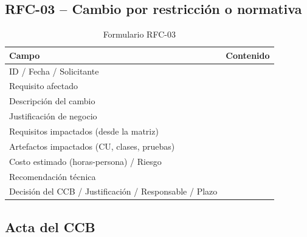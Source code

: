 \documentclass[journal,onecolumn]{IEEEtran}
\newcommand{\guia}[2]{%
	\begin{mdframed}[style=guia]
		\sloppy
		\noindent\textbf{Responsable: #1}\\[2pt]
		#2
	\end{mdframed}
}
\newif\ifguias
\let\guiaoriginal\guia
\renewcommand{\guia}[2]{\ifguias\guiaoriginal{#1}{#2}\fi}
\begin{document}
	\subsection{RFC-03 -- Cambio por restricción o normativa}
	
	\begin{table}[H]
		\centering
		\caption{Formulario RFC-03}
		\begin{tabular}{L{5.2cm} L{8.5cm}}
			\toprule
			\textbf{Campo} & \textbf{Contenido} \\
			\midrule
			ID / Fecha / Solicitante & \\
			Requisito afectado & \\
			Descripción del cambio & \\
			Justificación de negocio & \\
			Requisitos impactados (desde la matriz) & \\
			Artefactos impactados (CU, clases, pruebas) & \\
			Costo estimado (horas-persona) / Riesgo & \\
			Recomendación técnica & \\
			Decisión del CCB / Justificación / Responsable / Plazo & \\
			\bottomrule
		\end{tabular}
	\end{table}
	
	\guia{Kevin (Integrante 2)}{%
		RFC de \textbf{restricción o normativa}. El ERS ya trabaja sobre la \textbf{LOPDP}: 22 de
		las 50 filas de la matriz declaran una obligación legal explícita con su artículo, y hay
		RD orientadas a ello (RD-04 protección de datos, RD-06 eliminación de cuenta, RD-07
		notificación de vulneraciones, RD-09 anonimización). Una RFC que toque uno de esos frentes
		es plausible y trazable. Citar el artículo concreto invocado.}
	
	\subsection{Acta del CCB}
	
	\guia{Jonathan redacta -- Edson preside y firma}{%
		Contenido del acta: asistentes y roles (presidente, representante del cliente, analista);
		agenda; deliberación resumida por cada RFC con los argumentos de cada voto; decisión
		(aprobado / aprobado con condiciones / rechazado / diferido); justificación; acciones;
		responsables; plazos; versión resultante del ERS. Firmada.\\[3pt]
		Jonathan redacta el acta a partir de las notas de la sesión; Edson la preside, la revisa y
		recoge las firmas. Cada RFC \textbf{cierra con decisión motivada, acciones, responsable,
			plazo y versión resultante}: un acta sin responsables o sin versión resultante baja C3.
		La deliberación debe mostrar argumentos distintos por rol, no un «se aprueba por unanimidad».
		Con tres integrantes conviene que al menos una RFC salga \textbf{rechazada o diferida}:
		tres aprobaciones seguidas hacen que el CCB parezca un trámite y no una deliberación.}
	
\end{document}
